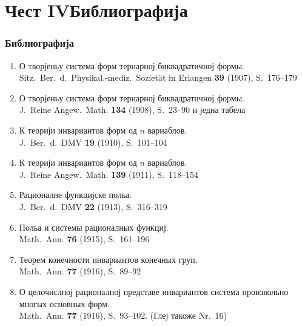 ﻿\documentclass[11pt]{article}
\newcommand{\foreign}[1]{#1}
\begin{document}
\part*{Чест IV\hspace{1em}Библиографија}

\section*{Библиографија}

\begin{enumerate}[label={\small\arabic*.},leftmargin=2em,itemsep=0.3em]
\item О творјеньу система форм тернарној биквадратичној формы.\\
\foreign{Sitz.\ Ber.\ d.\ Physikal.-mediz.\ Sozietät in Erlangen} \textbf{39} (1907), S.~176--179

\item О творјеньу система форм тернарној биквадратичној формы.\\
\foreign{J.\ Reine Angew.\ Math.} \textbf{134} (1908), S.~23--90 и једна табела

\item К теорији инвариантов форм од $n$ вариаблов.\\
\foreign{J.\ Ber.\ d.\ DMV} \textbf{19} (1910), S.~101--104

\item К теорији инвариантов форм од $n$ вариаблов.\\
\foreign{J.\ Reine Angew.\ Math.} \textbf{139} (1911), S.~118--154

\item Рационалне функцијске польа.\\
\foreign{J.\ Ber.\ d.\ DMV} \textbf{22} (1913), S.~316--319

\item Польа и системы рационалных функциј.\\
\foreign{Math.\ Ann.} \textbf{76} (1915), S.~161--196

\item Теорем конечности инвариантов конечных груп.\\
\foreign{Math.\ Ann.} \textbf{77} (1916), S.~89--92

\item О целочислној рационалној представе инвариантов система произвольно многых основных форм.\\
\foreign{Math.\ Ann.} \textbf{77} (1916), S.~93--102. (Глеј такоже Nr.~16)


\end{enumerate}
\end{document}
